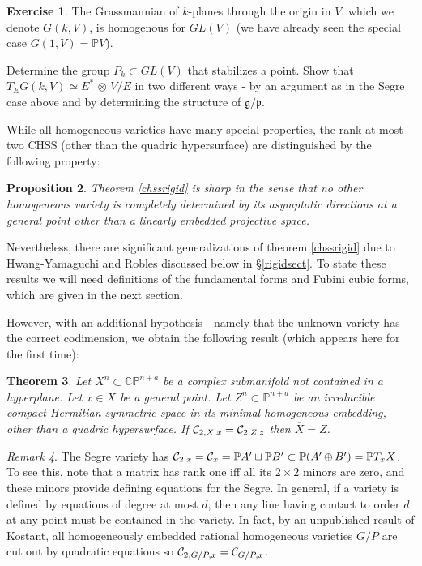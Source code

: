 \documentclass[11pt]{amsart}
\newtheorem{theorem}{Theorem}[section]
\newtheorem{proposition}[theorem]{Proposition}
\theoremstyle{definition}
\newtheorem{exercise}[theorem]{Exercise}
\theoremstyle{remark}
\newtheorem{remark}[theorem]{Remark}
\numberwithin{equation}{section}
\def\na{n+\alpha}
\def\BC{\mathbb C}\def\BF{\mathbb F}\def\BO{\mathbb O}\def\BS{\mathbb S}
\def\BP{\mathbb P}
\def\pp#1{\mathbb P^{#1}}
\def\pp#1{{\mathbb P}^{#1}}
\def\na{n+a}
\def\fg{{\mathfrak g}}
\def\fp{{\mathfrak p}}
\def\ot{{\mathord{\,\otimes }\,}}
\def\op{{\mathord{\,\oplus }\,}}
\begin{document}
\begin{exercise}  The Grassmannian of $k$-planes through
the origin in $V$, which we denote $G(k,V)$, is homogenous
for $GL(V)$ (we have already seen the special case
$G(1,V)=\BP V$). 
 

Determine the group $P_k\subset GL(V)$ that
stabilizes a point.
Show that $T_EG(k,V)\simeq E^*\ot V/E$ in two different
ways - by
an argument as in the Segre case above and by determining the structure of $\fg/\fp$.
\end{exercise}


While all homogeneous varieties have many special properties, the
rank at most two CHSS (other than the quadric hypersurface) are distinguished by the following property:

\begin{proposition}\cite{LM0} Theorem \ref{chssrigid} is sharp in the sense
that no other homogeneous variety is completely determined by
its asymptotic directions at a general point other than a linearly embedded
projective space.
\end{proposition}

Nevertheless, there are significant generalizations of theorem \ref{chssrigid}
due to Hwang-Yamaguchi and Robles discussed below in \S\ref{rigidsect}. To state these
results we will need definitions of the fundamental forms and Fubini cubic
forms, which are given in the next section.
 
\smallskip

However, with   an additional hypothesis - namely that the unknown
variety   has the correct codimension, we obtain the following result (which 
appears here for the first time):


\begin{theorem}\label{turbohy}
Let $X^n\subset \BC\pp\na$ be a complex submanifold not
contained in a hyperplane.  Let $x\in X$ be
a general point. Let  $Z^n\subset\pp{n+a}$ be an irreducible
  compact
Hermitian symmetric space in its minimal homogeneous embedding, other
than a quadric hypersurface.
 If ${\mathcal C}_{2,X,x}={\mathcal C}_{2,Z,z}$   
 then $\overline X =Z$.
\end{theorem} 
 

\begin{remark} 
The Segre variety has $\cC_{2, x}=\cC_{x}=\BP A'\sqcup \BP B'
\subset \BP (A'\op B')=\BP T_xX$.
 To see this, note
that a matrix has rank one iff all its $2\times 2$ minors
are zero, and these minors provide defining equations
for the Segre. In general, if a variety is defined by equations
of degree at most $d$, then any line having contact to order
$d$ at any point must be contained in the variety.  
In fact, by
an unpublished result of Kostant,  all homogeneously embedded rational homogeneous varieties $G/P$
are cut out by quadratic equations so ${\mathcal C}_{2,G/P,x}={\mathcal C}_{G/P,x}$.
\end{remark}
\end{document}
